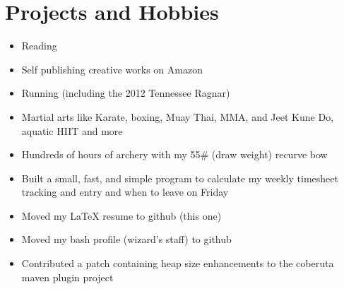 \documentclass[letterpaper,10pt]{article}
\newcommand{\resumeSubHeadingListStart}{\begin{itemize}[leftmargin=*]}
\newcommand{\resumeSubHeadingListEnd}{\end{itemize}}
\newcommand{\shorterSection}[1]{\vspace{-10pt}\section{#1}}
\begin{document}
\shorterSection{Projects and Hobbies}
  \resumeSubHeadingListStart
  \small
    \item{Reading}
    \vspace{-5pt}
    \item{Self publishing creative works on Amazon}
    \vspace{-5pt}
    \item{Running (including the 2012 Tennessee Ragnar)}
    \vspace{-5pt}
    \item{Martial arts like Karate, boxing, Muay Thai, MMA, and Jeet Kune Do, aquatic HIIT and more}
    \vspace{-5pt}
    \item{Hundreds of hours of archery with my 55\# (draw weight) recurve bow}
    \vspace{-5pt}
    \item{Built a small, fast, and simple program to calculate my weekly timesheet tracking and entry and when to leave on Friday}
    \vspace{-5pt}
    \item{Moved my \LaTeX\hspace{0.1mm} resume to github (this one)}
    \vspace{-5pt}
    \item{Moved my bash profile (wizard's staff) to github}
    \vspace{-5pt}
    \item{Contributed a patch containing heap size enhancements to the coberuta maven plugin project}
  \resumeSubHeadingListEnd

\end{document}
